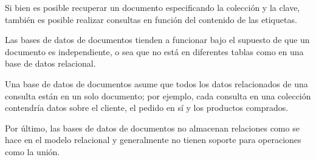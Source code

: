 Si bien es posible recuperar un documento especificando la colección y la clave, también es posible realizar consultas en función del contenido de las etiquetas.


Las bases de datos de documentos tienden a funcionar bajo el supuesto de que un documento es independiente, o sea que no está en diferentes tablas como en una base de datos relacional.


Una base de datos de documentos asume que todos los datos relacionados de una consulta están en un solo documento; por ejemplo, cada consulta en una colección contendría datos sobre el cliente, el pedido en sí y los productos comprados.


Por último, las bases de datos de documentos no almacenan relaciones como se hace en el modelo relacional y generalmente no tienen soporte para operaciones como la unión.
